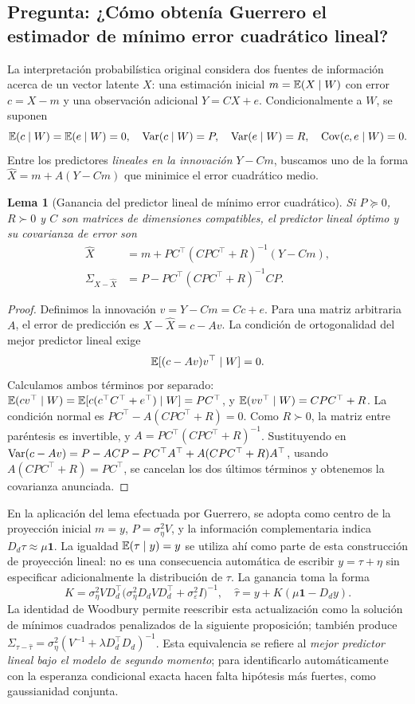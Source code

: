 \documentclass[11pt,letterpaper,parskip=half,headings=small]{scrartcl}
\newtheorem{lema}[proposicion]{Lema}
\theoremstyle{definition}\newtheorem{definicion}[proposicion]{Definición}
\theoremstyle{remark}\newtheorem{observacion}[proposicion]{Observación}
\newcommand{\Cov}{\operatorname{Cov}}\newcommand{\tr}{\operatorname{tr}}
\newcommand{\pregunta}[1]{\subsection{Pregunta: #1}}
\begin{document}
\pregunta{¿Cómo obtenía Guerrero el estimador de mínimo error cuadrático lineal?}
La interpretación probabilística original considera dos fuentes de información acerca de un vector latente $X$: una estimación inicial $m=\mathbb E(X\mid W)$ con error $c=X-m$ y una observación adicional $Y=CX+e$. Condicionalmente a $W$, se suponen
\[
\EE(c\mid W)=\EE(e\mid W)=0,\quad
\Var(c\mid W)=P,\quad \Var(e\mid W)=R,\quad
\Cov(c,e\mid W)=0.
\]
Entre los predictores \emph{lineales en la innovación} $Y-Cm$, buscamos uno de la forma $\widehat X=m+A(Y-Cm)$ que minimice el error cuadrático medio.
\begin{lema}[Ganancia del predictor lineal de mínimo error cuadrático]
Si $P\succeq0$, $R\succ0$ y $C$ son matrices de dimensiones compatibles, el predictor lineal óptimo y su covarianza de error son
\begin{align}
\widehat X&=m+PC^\top(CPC^\top+R)^{-1}(Y-Cm),\\
\Sigma_{X-\widehat X}&=P-PC^\top(CPC^\top+R)^{-1}CP.
\end{align}
\end{lema}
\begin{proof}
Definimos la innovación $v=Y-Cm=Cc+e$. Para una matriz arbitraria $A$, el error de predicción es $X-\widehat X=c-Av$. La condición de ortogonalidad del mejor predictor lineal exige
\[
\mathbb E[(c-Av)v^\top\mid W]=0.
\]
Calculamos ambos términos por separado:
$\mathbb E(cv^\top\mid W)=\mathbb E[c(c^\top C^\top+e^\top)\mid W]=PC^\top$, y
$\mathbb E(vv^\top\mid W)=CPC^\top+R$.
La condición normal es $PC^\top-A(CPC^\top+R)=0$. Como $R\succ0$, la matriz entre paréntesis es invertible, y
$A=PC^\top(CPC^\top+R)^{-1}$. Sustituyendo en
$\operatorname{Var}(c-Av)=P-AC P-PC^\top A^\top+A(CPC^\top+R)A^\top$, usando $A(CPC^\top+R)=PC^\top$, se cancelan los dos últimos términos y obtenemos la covarianza anunciada.
\end{proof}

En la aplicación del lema efectuada por Guerrero, se adopta como centro de la proyección inicial $m=y$, $P=\sigma_\eta^2V$, y la información complementaria indica $D_d\tau\approx\mu\bm1$. La igualdad $\mathbb E(\tau\mid y)=y$ se utiliza ahí como parte de esta construcción de proyección lineal: no es una consecuencia automática de escribir $y=\tau+\eta$ sin especificar adicionalmente la distribución de $\tau$. La ganancia toma la forma
\[
K=\sigma_\eta^2VD_d^\top\bigl(\sigma_\eta^2D_dVD_d^\top+\sigma_\varepsilon^2I\bigr)^{-1},
\quad \widehat\tau=y+K(\mu\bm1-D_dy).
\]
La identidad de Woodbury permite reescribir esta actualización como la solución de mínimos cuadrados penalizados de la siguiente proposición; también produce
$\Sigma_{\tau-\widehat\tau}=\sigma_\eta^2(V^{-1}+\lambda D_d^\top D_d)^{-1}$.
Esta equivalencia se refiere al \emph{mejor predictor lineal bajo el modelo de segundo momento}; para identificarlo automáticamente con la esperanza condicional exacta hacen falta hipótesis más fuertes, como gaussianidad conjunta.
\end{document}
